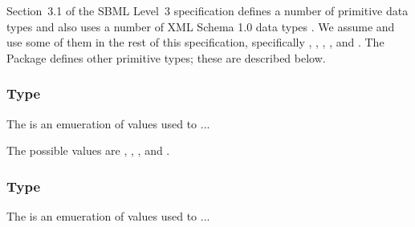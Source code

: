 Section~3.1 of the SBML Level~3 specification defines a number of
primitive data types and also uses a number of XML Schema 1.0 data types
\citep{biron:2000}. We assume and use some of them in the rest of this
specification, specifically , ,
, , and . The
\SpatialProcesses Package defines other primitive types; these are
described below.


\subsubsection{Type \fixttspace{}}



The  is an emueration of values used to
...

The possible values are ,
, ,
 and .

\subsubsection{Type \fixttspace{}}



The  is an emueration of values used to ...

